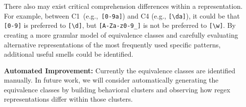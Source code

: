 There also may exist critical comprehension differences within a representation. For example, between C1~(e.g.,~\verb![0-9a]!) and C4 (e.g., \verb![\da]!), it could be that \verb![0-9]! is preferred to \verb![\d]!, but \verb![A-Za-z0-9_]! is not be preferred to \verb![\w]!.
By creating a more granular model of equivalence classes and carefully evaluating alternative representations of the most frequently used specific patterns, additional useful smells could be identified.

\noindent \textbf{Automated Improvement:}
Currently the equivalence classes are identified manually. In future work, we will consider automatically generating the equivalence classes by building behavioral clusters and observing how regex representations differ within those clusters. %

\iffalse
\noindent \textbf{Community-specific Comprehension:}
A straightforward way to assess understandability is to directly ask software professionals which regexes they prefer and why.
In our evaluation, we did not focus on a specific community or a specific regex purpose (e.g., validating e-mail address, validating IP-address, parsing URLs).
 If an understandability study used regexes sampled from the codebase of a specific community (e.g., most frequently observed regexes, most buggy regexes, regexes on the hottest execution paths, etc.), and measured the understanding of programming professionals working in that community, then the measurements and the refactoring they imply would be more likely to have a direct impact.
 \fi
%

